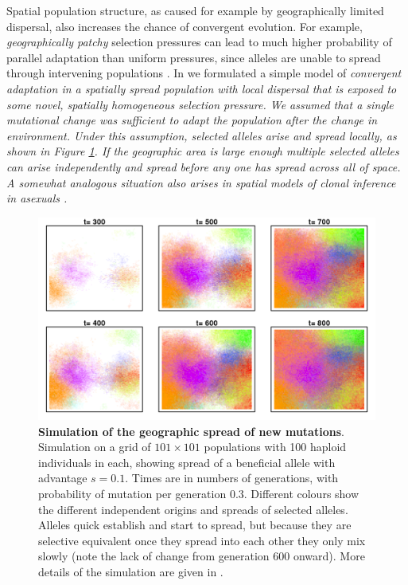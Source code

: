 \documentclass{article}
\newcommand{\gc}[1]{{\it\color{blue}#1}}
\begin{document}
Spatial population structure,
as caused for example by geographically limited dispersal, 
also increases the chance of convergent evolution. 
For example, 
\gc{geographically patchy} selection pressures can lead to much higher probability of parallel adaptation than uniform pressures,
since alleles are unable to spread through intervening populations
\citep{RalphCoop:14}. 
In \citet{ralphcoop2010} we formulated a simple model of \gc{convergent adaptation in 
a spatially spread population with local dispersal
that is exposed to some novel, spatially homogeneous selection pressure.
We assumed that a single mutational change was sufficient to adapt
the population after the change in environment. Under this assumption,
selected alleles arise and spread locally, as shown in Figure \ref{fig:sim-spread}. 
If the geographic area is large enough multiple selected alleles can
arise independently and spread before any one has spread across all of space. 
A somewhat analogous situation also
arises in spatial models of clonal inference in asexuals \citep{gordo_adaptive_2006,martens_interfering_2011,otwinowski_clonal_2014}.}



\begin{figure}[ht]
  \begin{center}
    \includegraphics[width=\textwidth]{sims/Peter_sims.png}
  \end{center}
  \caption{
{\bf Simulation of the geographic spread of new mutations}. Simulation
on a grid of $101 \times 101$ populations with 100 haploid individuals
in each, showing spread of a beneficial allele with advantage $s=0.1$.
Times are in numbers of generations, with probability of mutation per
generation 0.3. Different colours show the different independent
origins and spreads of selected alleles. Alleles quick establish and
start to spread, but because they are selective equivalent once they
spread into each other they only mix slowly (note the lack of change
from generation 600 onward). More details of the
simulation are given in \citet{ralphcoop2010}. 
}
  \label{fig:sim-spread}
\end{figure}
\end{document}
